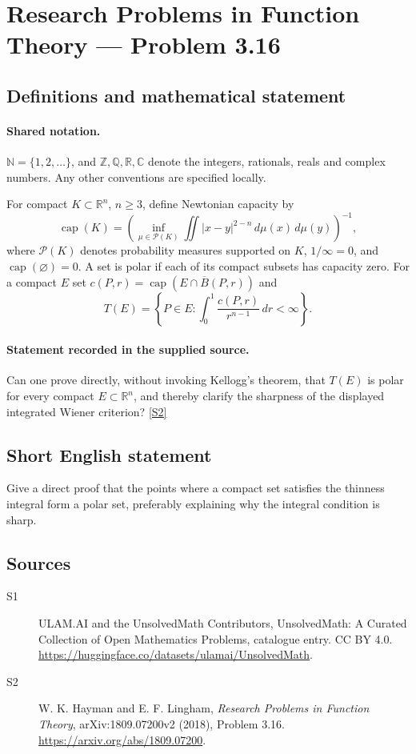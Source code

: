 \documentclass[11pt]{article}
\newcommand{\sref}[2]{\hyperlink{source:#1:#2}{[S#2]}}
\begin{document}
\section{Research Problems in Function Theory — Problem 3.16}\label{statement}

\subsection{Definitions and mathematical statement}

\paragraph{Shared notation.}$\mathbb N=\{1,2,\ldots\}$, and $\mathbb Z,\mathbb Q,\mathbb R,\mathbb C$ denote the integers, rationals, reals and complex numbers. Any other conventions are specified locally.


For compact $K\subset\mathbb R^n$, $n\geq3$, define Newtonian capacity by
\[\operatorname{cap}(K)=\left(\inf_{\mu\in\mathcal P(K)}\iint |x-y|^{2-n}\,d\mu(x)\,d\mu(y)\right)^{-1},\]
where $\mathcal P(K)$ denotes probability measures supported on $K$, $1/\infty=0$, and $\operatorname{cap}(\varnothing)=0$. A set is polar if each of its compact subsets has capacity zero. For a compact $E$ set $c(P,r)=\operatorname{cap}(E\cap\overline B(P,r))$ and
\[T(E)=\left\{P\in E:\int_0^1\frac{c(P,r)}{r^{n-1}}\,dr<\infty\right\}.\]
\paragraph{Statement recorded in the supplied source.}
Can one prove directly, without invoking Kellogg's theorem, that $T(E)$ is polar for every compact $E\subset\mathbb R^n$, and thereby clarify the sharpness of the displayed integrated Wiener criterion? \sref{statement}{2}
\subsection{Short English statement}
Give a direct proof that the points where a compact set satisfies the thinness integral form a polar set, preferably explaining why the integral condition is sharp.
\subsection{Sources}
\begin{description}
\item[\hypertarget{source:statement:1}{S1}] ULAM.AI and the UnsolvedMath Contributors, UnsolvedMath: A Curated Collection of Open Mathematics Problems, catalogue entry. CC BY 4.0. \url{https://huggingface.co/datasets/ulamai/UnsolvedMath}.
\item[\hypertarget{source:statement:2}{S2}] W. K. Hayman and E. F. Lingham, \emph{Research Problems in Function Theory}, arXiv:1809.07200v2 (2018), Problem 3.16. \url{https://arxiv.org/abs/1809.07200}.
\end{description}
\label{end:statement}
\end{document}
